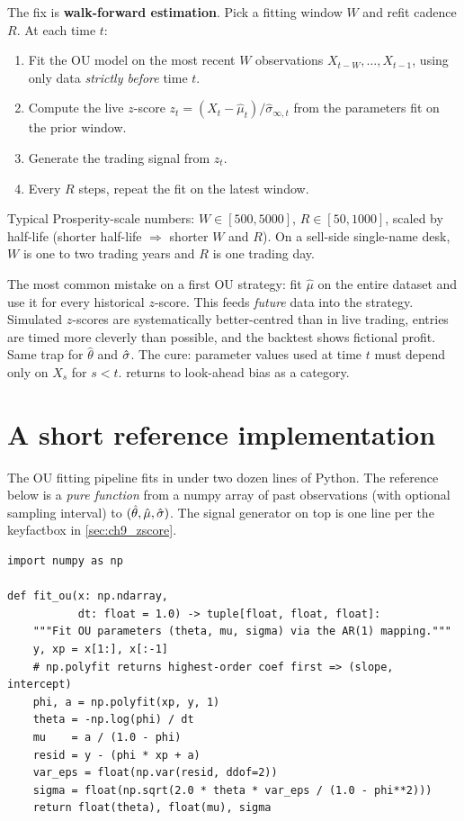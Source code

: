 The fix is \textbf{walk-forward estimation}. Pick a fitting
window $W$ and refit cadence $R$. At each time $t$:
\begin{enumerate}
  \item Fit the OU model on the most recent $W$ observations
  $X_{t-W}, \ldots, X_{t-1}$, using only data \emph{strictly
  before} time $t$.
  \item Compute the live $z$-score
  $z_t = (X_t - \hat\mu_t)/\hat\sigma_{\infty,t}$ from the
  parameters fit on the prior window.
  \item Generate the trading signal from $z_t$.
  \item Every $R$ steps, repeat the fit on the latest window.
\end{enumerate}
Typical Prosperity-scale numbers: $W \in [500, 5000]$,
$R \in [50, 1000]$, scaled by half-life (shorter half-life
$\Rightarrow$ shorter $W$ and $R$). On a sell-side single-name
desk, $W$ is one to two trading years and $R$ is one trading
day.

\begin{pitfallbox}
The most common mistake on a first OU strategy: fit $\hat\mu$ on
the entire dataset and use it for every historical $z$-score.
This feeds \emph{future} data into the strategy. Simulated
$z$-scores are systematically better-centred than in live
trading, entries are timed more cleverly than possible, and the
backtest shows fictional profit. Same trap for $\hat\theta$ and
$\hat{\sigma}$. The cure: parameter values used at time $t$ must
depend only on $X_s$ for $s < t$.  returns
to look-ahead bias as a category.
\end{pitfallbox}

\section{A short reference implementation}
\label{sec:ch9_code}

The OU fitting pipeline fits in under two dozen lines of Python.
The reference below is a \emph{pure function} from a numpy array
of past observations (with optional sampling interval) to
$(\hat\theta, \hat\mu, \hat{\sigma})$. The signal generator on top
is one line per the keyfactbox in \cref{sec:ch9_zscore}.

\begin{lstlisting}[caption={OU fitting via AR(1) as a pure function.}]
import numpy as np

def fit_ou(x: np.ndarray,
           dt: float = 1.0) -> tuple[float, float, float]:
    """Fit OU parameters (theta, mu, sigma) via the AR(1) mapping."""
    y, xp = x[1:], x[:-1]
    # np.polyfit returns highest-order coef first => (slope, intercept)
    phi, a = np.polyfit(xp, y, 1)
    theta = -np.log(phi) / dt
    mu    = a / (1.0 - phi)
    resid = y - (phi * xp + a)
    var_eps = float(np.var(resid, ddof=2))
    sigma = float(np.sqrt(2.0 * theta * var_eps / (1.0 - phi**2)))
    return float(theta), float(mu), sigma
\end{lstlisting}

